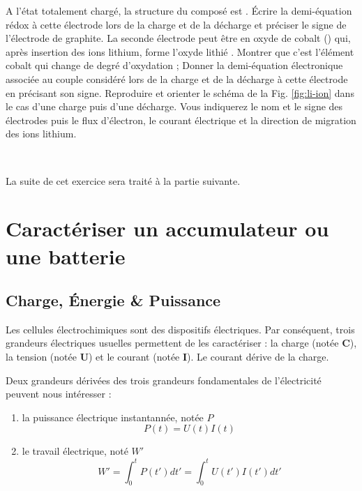 {\Q A l'état totalement chargé, la structure du composé est . Écrire la demi-équation rédox à cette électrode lors de la charge et de la décharge et préciser le signe de l'électrode de graphite.
La seconde électrode peut être en oxyde de cobalt () qui, après insertion des ions lithium,
forme l'oxyde lithié . 
\Q Montrer que c'est l'élément cobalt qui change de degré d'oxydation ;
\Q Donner la demi-équation électronique associée au couple considéré lors de la charge et de la décharge
à cette électrode en précisant son signe.
\Q Reproduire et orienter le schéma de la Fig. \ref{fig:li-ion} dans le cas d'une charge puis d'une décharge. Vous indiquerez le nom et le signe des électrodes puis le flux d'électron, le courant électrique et la direction de migration des ions lithium.

~

La suite de cet exercice sera traité à la partie suivante.}

\section{Caractériser un accumulateur ou une batterie}

\subsection{Charge, \'{E}nergie \& Puissance}
Les cellules électrochimiques sont des dispositifs électriques. Par conséquent, trois grandeurs électriques usuelles permettent de les caractériser : la charge (notée \textbf{C}), la tension (notée \textbf{U}) et le courant (notée \textbf{I}). Le courant dérive de la charge.

Deux grandeurs dérivées des trois grandeurs fondamentales de l'électricité peuvent nous intéresser :

\begin{enumerate}
    \item la puissance électrique instantannée, notée $P$
    \begin{equation}
        P(t) = U(t) I(t)
        \label{eq:puissance}
    \end{equation}
    \item le travail électrique, noté $W'$
    \begin{equation}
        W' = \int_0^t P(t') dt' = \int_0^t U(t') I(t') dt'
        \label{eq:travail}
    \end{equation}
\end{enumerate}

